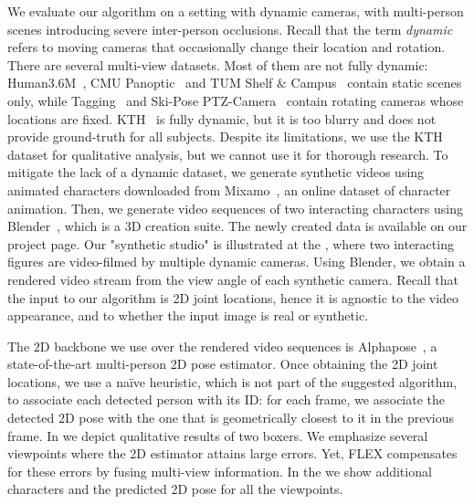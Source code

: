 We evaluate our algorithm on
a setting with dynamic cameras, with multi-person scenes introducing
severe inter-person occlusions.
Recall that the term \emph{dynamic} refers to moving cameras that occasionally change their location and rotation.
%
There are several multi-view datasets. Most of them are not fully dynamic: Human3.6M~\cite{h36m_pami,IonescuSminchisescu11}, CMU Panoptic~\cite{CMU:mocap} and TUM Shelf $\&$ Campus~\cite{campus_shelf} contain static scenes only, while Tagging~\cite{tagging_dataset} and Ski-Pose PTZ-Camera~\cite{ski_ptz} contain  rotating cameras whose locations are fixed. KTH~\cite{footballDS} is fully dynamic, but it is too blurry and does not provide ground-truth for all subjects.
Despite its limitations, we use the KTH dataset for qualitative analysis, but we cannot use it for thorough research.
To mitigate the lack of a dynamic dataset, we generate synthetic videos using animated characters downloaded from Mixamo~\cite{mixamo}, an online dataset of character animation. Then, we generate video sequences of two interacting characters using Blender~\cite{blender}, which is a 3D creation suite. The newly created data is available on our project page.
Our "synthetic studio" is illustrated at the \fi, where two interacting figures are video-filmed by multiple dynamic cameras.
Using Blender, we obtain a rendered video stream from the view angle of each synthetic camera. 
Recall that the input to our algorithm is 2D joint locations, hence it is agnostic to the video appearance, and to whether the input image is real or synthetic.

The 2D backbone we use over the rendered video sequences is Alphapose~\cite{alphapose}, a state-of-the-art multi-person 2D pose estimator.
Once obtaining the 2D joint locations, we use a na\"ive heuristic, which is not part of the suggested algorithm, to associate each detected person with its ID: for each frame, we associate the detected 2D pose with the one that is geometrically closest to it in the previous frame. 
In  we depict qualitative results of two boxers. We emphasize several viewpoints where the 2D estimator attains large errors. Yet, FLEX compensates for these errors by fusing multi-view information. In the \fi we show additional characters and the predicted 2D pose for all the viewpoints.


